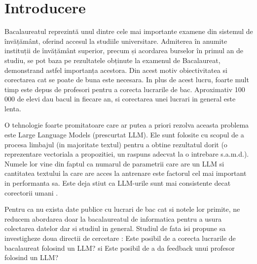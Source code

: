 \chapter{Introducere}
Bacalaureatul reprezintă unul dintre cele mai importante examene din sistemul de învățământ, oferind accesul la studiile universitare.
Admiterea în anumite instituții de învățământ superior, precum și acordarea burselor în primul an de studiu, se pot baza pe rezultatele obținute la examenul de Bacalaureat, demonstrand astfel importanța acestora. Din acest motiv obiectivitatea si corectarea cat se poate de buna este necesara.
In plus de acest lucru, foarte mult timp este depus de profesori pentru a corecta lucrarile de bac. Aproximativ 100 000 de elevi dau bacul in fiecare an, si corectarea unei lucrari in general este lenta.

O tehnologie \cite{golchin} foarte promitatoare care ar putea a priori rezolva aceasta problema este Large Language Models (prescurtat LLM). Ele sunt folosite cu scopul de a procesa limbajul (in majoritate textul)
pentru a obtine rezultatul dorit (o reprezentare vectoriala a propozitiei, un raspuns adecvat la o intrebare s.a.m.d.). Numele lor vine din faptul ca numarul de parametrii care are un LLM si cantitatea textului la care are acces la antrenare este factorul cel mai important in performanta sa. Este deja stiut ca LLM-urile sunt mai consistente decat corectorii umani .

Pentru ca nu exista date publice cu lucrari de bac cat si notele lor primite, ne reducem abordarea doar la bacalaureatul de informatica pentru a usura colectarea datelor dar si studiul in general. Studiul de fata isi propune sa investigheze doua directii de cercetare : Este posibil de a corecta lucrarile de bacalaureat folosind un LLM? si Este posibil de a da feedback unui profesor folosind un LLM?